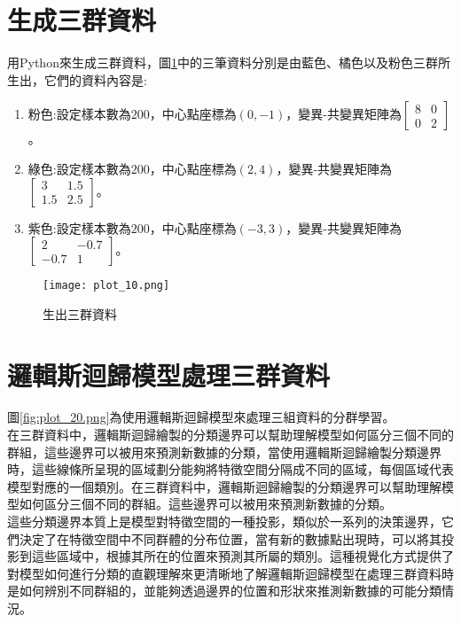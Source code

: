 \documentclass[12pt, a4paper]{article}
\begin{document}
\section{生成三群資料}
用Python來生成三群資料，圖\;\ref{fig:plot_10.png}\;中的三筆資料分別是由藍色、橘色以及粉色三群所生出，它們的資料內容是\;:
\begin{enumerate}
\item 粉色\;:\;設定樣本數為\;$200$\;，中心點座標為\;$(0,-1)$\;，變異\;-\;共變異矩陣為\;$\begin{bmatrix}8 & 0 \\0 & 2 \end{bmatrix}$\;。

\item 綠色\;:\;設定樣本數為\;$200$\;，中心點座標為\;$(2,4)$\;，變異\;-\;共變異矩陣為\;$\begin{bmatrix}3 & 1.5 \\1.5 & 2.5 \end{bmatrix}$\;。

\item 紫色\;:\;設定樣本數為\;$200$\;，中心點座標為\;$(-3,3)$\;，變異\;-\;共變異矩陣為\;$\begin{bmatrix}2 & -0.7 \\-0.7 & 1 \end{bmatrix}$\;。
\end{enumerate}

\begin{figure}[H]
\centering
\texttt{[image: plot\_10.png]}
\caption{生出三群資料}
\label{fig:plot_10.png}
\end{figure}

\section{邏輯斯迴歸模型處理三群資料}
圖\;\ref{fig:plot_20.png}\;為使用邏輯斯迴歸模型來處理三組資料的分群學習。\\
在三群資料中，邏輯斯迴歸繪製的分類邊界可以幫助理解模型如何區分三個不同的群組，這些邊界可以被用來預測新數據的分類，當使用邏輯斯迴歸繪製分類邊界時，這些線條所呈現的區域劃分能夠將特徵空間分隔成不同的區域，每個區域代表模型對應的一個類別。在三群資料中，邏輯斯迴歸繪製的分類邊界可以幫助理解模型如何區分三個不同的群組。這些邊界可以被用來預測新數據的分類。\\
這些分類邊界本質上是模型對特徵空間的一種投影，類似於一系列的決策邊界，它們決定了在特徵空間中不同群體的分布位置，當有新的數據點出現時，可以將其投影到這些區域中，根據其所在的位置來預測其所屬的類別。這種視覺化方式提供了對模型如何進行分類的直觀理解來更清晰地了解邏輯斯迴歸模型在處理三群資料時是如何辨別不同群組的，並能夠透過邊界的位置和形狀來推測新數據的可能分類情況。
\end{document}
